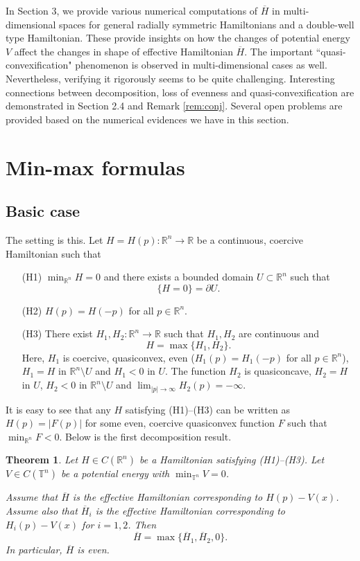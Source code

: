 \documentclass[12pt,reqno]{amsart}
\theoremstyle{plain}
\newtheorem{thm}{Theorem}[section]
\theoremstyle{remark}
\numberwithin{equation}{section}
\newcommand{\R}{\mathbb{R}}
\newcommand{\T}{\mathbb{T}}
\newcommand{\ol}{\overline}
\begin{document}
In Section 3,  we  provide various numerical computations of $\ol{H}$ in multi-dimensional spaces for general radially symmetric Hamiltonians and a double-well type Hamiltonian.  
These provide insights on how the changes of potential energy $V$ affect the changes in shape of effective Hamiltonian $\ol{H}$.  The important  ``quasi-convexification" phenomenon is observed  in multi-dimensional cases as well.  Nevertheless,  verifying  it rigorously seems to be quite challenging.  Interesting connections between decomposition,  loss of evenness and quasi-convexification are demonstrated  in  Section 2.4 and  Remark \ref{rem:conj}.  Several open problems are provided based on the numerical  evidences we have in this section.



\section{Min-max formulas} \label{sec:min-max}
\subsection{Basic case}
The setting is this. Let $H=H(p): \R^n \to \R$ be a continuous, coercive Hamiltonian such that
\begin{itemize}
\item[(H1)] $\min_{\R^n} H=0$ and there exists a bounded domain $U \subset \R^n$ such that 
\[
\{H=0\}=\partial U.
\]
\item[(H2)] $H(p)=H(-p)$ for all $p\in \R^n$.
\item[(H3)] There exist $H_1, H_2: \R^n \to \R$ such that $H_1, H_2$ are continuous and 
\[
H=\max\{H_1,H_2\}.
\]
Here, $H_1$ is coercive, quasiconvex, even ($H_1(p)=H_1(-p)$ for all $p\in \R^n$), $H_1=H$ in $\R^n \setminus U$
and $H_1 <0$ in $U$.
The function $H_2$ is quasiconcave, $H_2=H$ in $U$, $H_2<0$ in $\R^n \setminus U$ and $\lim_{|p| \to \infty} H_2(p)=-\infty$.
\end{itemize}
It is easy to see that  any  $H$ satisfying (H1)--(H3)  can be written as $H(p)=|F(p)|$ for some  even, coercive quasiconvex function $F$ such that $\min_{\R^n} F<0$. Below is the first decomposition result. 

\begin{thm}\label{thm:rep1}
Let $H \in C(\R^n)$ be a Hamiltonian satisfying {\rm (H1)--(H3)}.
Let $V \in C(\T^n)$ be a potential energy with $\min_{\T^n} V=0$.

Assume that $\ol{H}$ is the effective Hamiltonian corresponding to $H(p)-V(x)$.
Assume also that $\ol{H}_i$ is the effective Hamiltonian corresponding to $H_i(p)- V(x)$ for $i=1,2$.
Then
\[
\ol{H} = \max\{\ol{H}_1, \ol{H}_2,0\}.
\]
In particular,  $\ol H$ is even. 
\end{thm}
\end{document}
